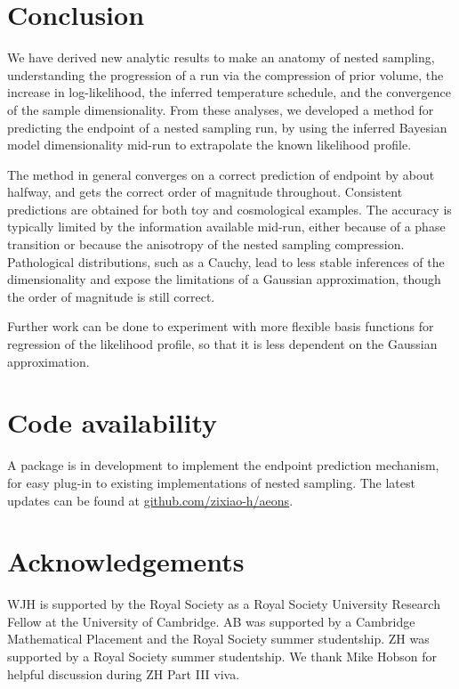 \documentclass[usenatbib]{mnras}
\begin{document}
\section{Conclusion}
We have derived new analytic results to make an anatomy of nested sampling, understanding the progression of a run via the compression of prior volume, the increase in log-likelihood, the inferred temperature schedule, and the convergence of the sample dimensionality. From these analyses, we developed a method for predicting the endpoint of a nested sampling run, by using the inferred Bayesian model dimensionality mid-run to extrapolate the known likelihood profile. 
\par
The method in general converges on a correct prediction of endpoint by about halfway, and gets the correct order of magnitude throughout. Consistent predictions are obtained for both toy and cosmological examples. The accuracy is typically limited by the information available mid-run, either because of a phase transition or because the anisotropy of the nested sampling compression. Pathological distributions, such as a Cauchy, lead to less stable inferences of the dimensionality and expose the limitations of a Gaussian approximation, though the order of magnitude is still correct.
\par
Further work can be done to experiment with more flexible basis functions for regression of the likelihood profile, so that it is less dependent on the Gaussian approximation.

\section*{Code availability}
A package is in development to implement the endpoint prediction mechanism, for easy plug-in to existing implementations of nested sampling. The latest updates can be found at \href{https://github.com/zixiao-h/aeons}{github.com/zixiao-h/aeons}.

\section*{Acknowledgements}
WJH is supported by the Royal Society as a Royal Society University Research Fellow at the University of Cambridge. AB was supported by a Cambridge Mathematical Placement and the Royal Society summer studentship. ZH was supported by a Royal Society summer studentship. We thank Mike Hobson for helpful discussion during ZH Part III viva.




\label{lastpage}
\end{document}
